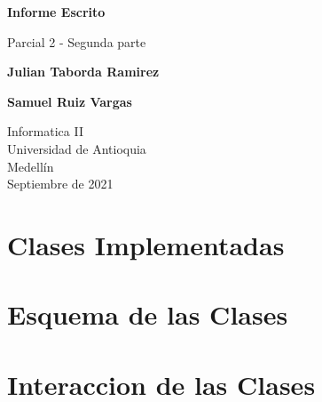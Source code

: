 \documentclass{article}
\begin{document}
\begin{titlepage}
    \begin{center}
        \vspace*{1cm}
            
        \Huge
        \textbf{Informe Escrito}
            
        \vspace{0.5cm}
        \LARGE
        Parcial 2 - Segunda parte
            
        \vspace{1.5cm}
            
        \textbf{Julian Taborda Ramirez}
        
        \vspace{0.5cm}
        
        \textbf{Samuel Ruiz Vargas}
            
        \vfill
            
        \vspace{0.8cm}
            
        \Large
        Informatica II\\
        Universidad de Antioquia\\
        Medellín\\
        Septiembre de 2021
            
    \end{center}
\end{titlepage}

\tableofcontents
\vspace*{1.2cm}

\newpage

\section{Clases Implementadas}
\label{clases}

    \begin{flushleft}

    \end{flushleft}

    
\section{Esquema de las Clases}
\label{esquema}
    \begin{flushleft}

    \end{flushleft}
        
    
\section{Interaccion de las Clases}
\label{interacciones}
    \begin{flushleft}
    
    \end{flushleft}
    
\end{document}
